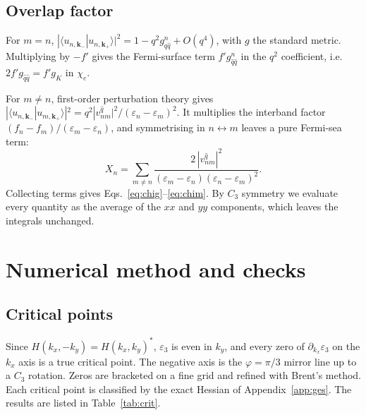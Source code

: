 \documentclass[12pt,a4paper]{article}
\newcommand{\bk}{\mathbf{k}}
\newcommand{\chie}{\chi_{e}}
\begin{document}
\subsection{Overlap factor}

For $m=n$, $|\langle u_{n,\bk_-}|u_{n,\bk_+}\rangle|^2=1-q^2g^n_{\hat q\hat q}+O(q^4)$, with $g$ the standard metric. Multiplying by $-f'$ gives the Fermi-surface term $f'g^n_{\hat q\hat q}$ in the $q^2$ coefficient, i.e.\ $2f'g_{\hat q\hat q}=f'g_K$ in $\chie$.

For $m\ne n$, first-order perturbation theory gives $|\langle u_{n,\bk_-}|u_{m,\bk_+}\rangle|^2=q^2|v^{\hat q}_{nm}|^2/(\varepsilon_n-\varepsilon_m)^2$. It multiplies the interband factor $(f_n-f_m)/(\varepsilon_m-\varepsilon_n)$, and symmetrising in $n\leftrightarrow m$ leaves a pure Fermi-sea term:
\begin{equation}
X_n=\sum_{m\neq n}\frac{2\,|v^{\hat q}_{nm}|^2}{(\varepsilon_m-\varepsilon_n)(\varepsilon_n-\varepsilon_m)^2}.
\end{equation}
Collecting terms gives Eqs.~\eqref{eq:chig}--\eqref{eq:chim}. By $C_3$ symmetry we evaluate every quantity as the average of the $xx$ and $yy$ components, which leaves the integrals unchanged.

\section{Numerical method and checks}\label{app:numerics}

\subsection{Critical points}

Since $H(k_x,-k_y)=H(k_x,k_y)^*$, $\varepsilon_3$ is even in $k_y$, and every zero of $\partial_{k_x}\varepsilon_3$ on the $k_x$ axis is a true critical point. The negative axis is the $\varphi=\pi/3$ mirror line up to a $C_3$ rotation. Zeros are bracketed on a fine grid and refined with Brent's method. Each critical point is classified by the exact Hessian of Appendix~\ref{app:ges}. The results are listed in Table~\ref{tab:crit}.
\end{document}
